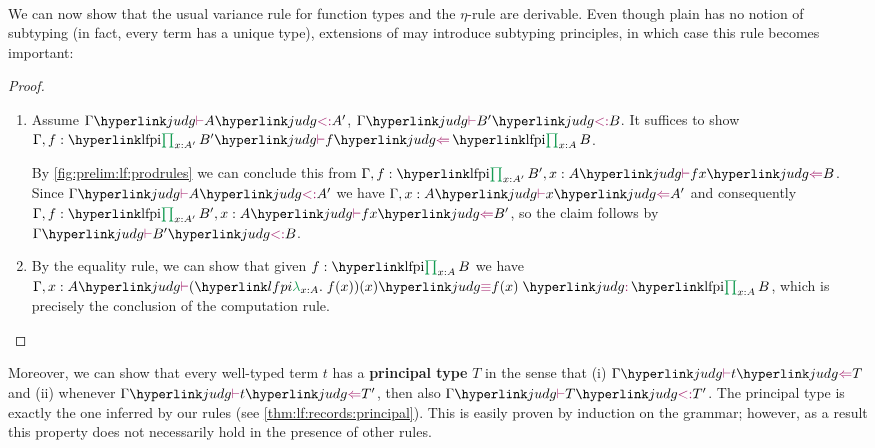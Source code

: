 \paragraph{} We can now show that the usual variance rule for function types and the $\eta$-rule are derivable. Even though plain \LF has no notion of subtyping (in fact, every term has a unique type), extensions of \LF may introduce subtyping principles, in which case this rule becomes important:
\begin{theorem}\label{thm:prelim:lf:variance}
\end{theorem}
\begin{proof}\begin{enumerate}
	\item Assume $\gjudg{\subtp A{A'}}$, $\gjudg{\subtp{B'}B}$. It suffices to show $\judg{\Gamma,f:\lfpi{x:A'}{B'}}{\hastype f{\lfpi{x:A}B}}$.
	
	By \autoref{fig:prelim:lf:prodrules} we can conclude this from $\judg{\Gamma,f:\lfpi{x:A'}{B'},x:A}{\hastype{f x}B}$. Since $\gjudg{\subtp A{A'}}$ we have 
	$\judg{\Gamma,x:A}{\hastype x{A'}}$ and consequently
		$\judg{\Gamma,f:\lfpi{x:A'}{B'},x:A}{\hastype{f x}B'}$, so the claim follows by $\gjudg{\subtp{B'}B}$.
		
	\item By the equality rule, we can show that given $f:\lfpi{x:A}B$ we have $\judg{\Gamma,x:A}{\judgeq{(\lflambda{x:A}{f(x)})(x)}{f(x)}{\lfpi{x:A}B}}$, which is precisely the conclusion of the computation rule.
\end{enumerate}\end{proof}


Moreover, we can show that every well-typed term $t$ has a \textbf{principal type} $T$ in the sense that (i) $\gjudg{\hastype tT}$ and (ii) whenever $\gjudg{\hastype t{T'}}$, then also $\gjudg{\subtp T{T'}}$.
The principal type is exactly the one inferred by our rules (see \autoref{thm:lf:records:principal}). This is easily proven by induction on the grammar; however, as a result this property does not necessarily hold in the presence of other rules.

